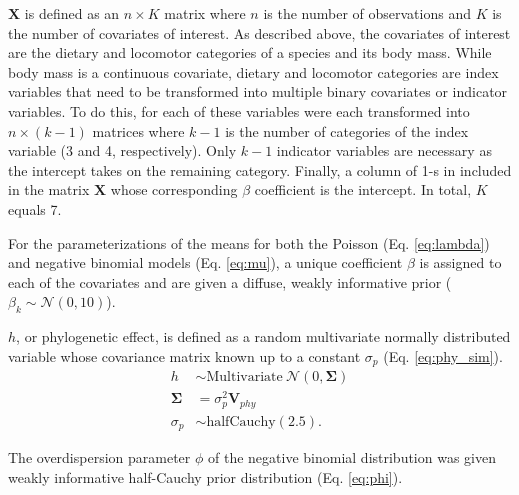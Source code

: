 \documentclass[12pt,letterpaper]{article}
\begin{document}
\(\mathbf{X}\) is defined as an \(n \times K\) matrix where \(n\) is the number of observations and \(K\) is the number of covariates of interest. As described above, the covariates of interest are the dietary and locomotor categories of a species and its body mass. While body mass is a continuous covariate, dietary and locomotor categories are index variables that need to be transformed into multiple binary covariates or indicator variables. To do this, for each of these variables were each transformed into \(n \times (k - 1)\) matrices where \(k - 1\) is the number of categories of the index variable (3 and 4, respectively). Only \(k - 1\) indicator variables are necessary as the intercept takes on the remaining category. Finally, a column of 1-s in included in the matrix \(\mathbf{X}\) whose corresponding \(\beta\) coefficient is the intercept. In total, \(K\) equals 7.

For the parameterizations of the means for both the Poisson (Eq. \ref{eq:lambda}) and negative binomial models (Eq. \ref{eq:mu}), a unique coefficient \(\beta\) is assigned to each of the covariates and are given a diffuse, weakly informative prior (\(\beta_{k} \sim \mathcal{N}(0, 10)\)).

\(h\), or phylogenetic effect, is defined as a random multivariate normally distributed variable whose covariance matrix known up to a constant \(\sigma_{p}\) (Eq. \ref{eq:phy_sim}).
\begin{align}
  h &\sim \mathrm{Multivariate\ }\mathcal{N}(0, \mathbf{\Sigma}) \label{eq:phy_sim} \\
  \mathbf{\Sigma} &= \sigma_{p}^{2} \mathbf{V}_{phy} \nonumber \\
  \sigma_{p} &\sim \mathrm{halfCauchy}(2.5). \nonumber
\end{align}

The overdispersion parameter \(\phi\) of the negative binomial distribution was given weakly informative half-Cauchy prior distribution (Eq. \ref{eq:phi}).
\end{document}
